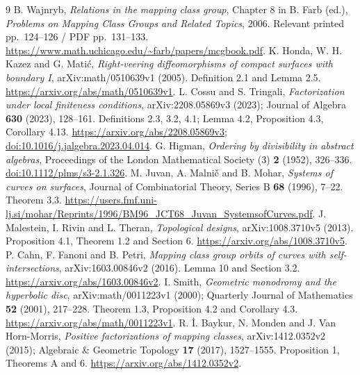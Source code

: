 \documentclass[11pt]{article}
\begin{document}
\begin{thebibliography}{9}
 B. Wajnryb, \emph{Relations in the mapping class group}, Chapter 8 in B. Farb (ed.), \emph{Problems on Mapping Class Groups and Related Topics}, 2006. Relevant printed pp.~124--126 / PDF pp.~131--133.
\url{https://www.math.uchicago.edu/~farb/papers/mcgbook.pdf}.
 K. Honda, W. H. Kazez and G. Mati\'c, \emph{Right-veering diffeomorphisms of compact surfaces with boundary I}, arXiv:math/0510639v1 (2005). Definition 2.1 and Lemma 2.5.
\url{https://arxiv.org/abs/math/0510639v1}.
 L. Cossu and S. Tringali, \emph{Factorization under local finiteness conditions}, arXiv:2208.05869v3 (2023); Journal of Algebra \textbf{630} (2023), 128--161. Definitions 2.3, 3.2, 4.1; Lemma 4.2, Proposition 4.3, Corollary 4.13.
\url{https://arxiv.org/abs/2208.05869v3}; \href{https://doi.org/10.1016/j.jalgebra.2023.04.014}{doi:10.1016/j.jalgebra.2023.04.014}.
 G. Higman, \emph{Ordering by divisibility in abstract algebras}, Proceedings of the London Mathematical Society (3) \textbf{2} (1952), 326--336.
\href{https://doi.org/10.1112/plms/s3-2.1.326}{doi:10.1112/plms/s3-2.1.326}.
 M. Juvan, A. Malni\v c and B. Mohar, \emph{Systems of curves on surfaces}, Journal of Combinatorial Theory, Series B \textbf{68} (1996), 7--22. Theorem 3.3.
\url{https://users.fmf.uni-lj.si/mohar/Reprints/1996/BM96_JCT68_Juvan_SystemsofCurves.pdf}.
 J. Malestein, I. Rivin and L. Theran, \emph{Topological designs}, arXiv:1008.3710v5 (2013). Proposition 4.1, Theorem 1.2 and Section 6.
\url{https://arxiv.org/abs/1008.3710v5}.
 P. Cahn, F. Fanoni and B. Petri, \emph{Mapping class group orbits of curves with self-intersections}, arXiv:1603.00846v2 (2016). Lemma 10 and Section 3.2.
\url{https://arxiv.org/abs/1603.00846v2}.
 I. Smith, \emph{Geometric monodromy and the hyperbolic disc}, arXiv:math/0011223v1 (2000); Quarterly Journal of Mathematics \textbf{52} (2001), 217--228. Theorem 1.3, Proposition 4.2 and Corollary 4.3.
\url{https://arxiv.org/abs/math/0011223v1}.
 R. \.{I}. Baykur, N. Monden and J. Van Horn-Morris, \emph{Positive factorizations of mapping classes}, arXiv:1412.0352v2 (2015); Algebraic \& Geometric Topology \textbf{17} (2017), 1527--1555. Proposition 1, Theorems A and 6.
\url{https://arxiv.org/abs/1412.0352v2}.
\end{thebibliography}
\end{document}
